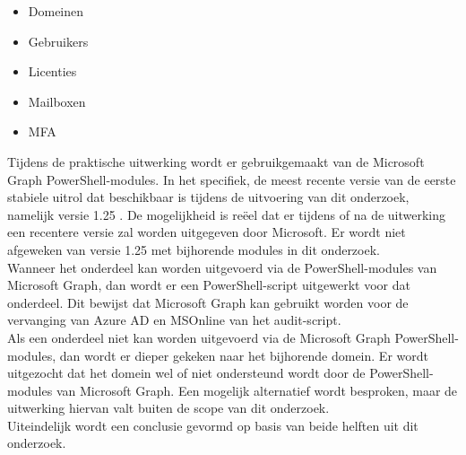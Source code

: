 \begin{itemize}
    \item Domeinen
    \item Gebruikers
    \item Licenties
    \item Mailboxen
    \item \ac{MFA}
\end{itemize}

Tijdens de praktische uitwerking wordt er gebruikgemaakt van de Microsoft Graph PowerShell-modules. In het specifiek, de meest recente versie van de eerste stabiele uitrol dat beschikbaar is tijdens de uitvoering van dit onderzoek, namelijk versie 1.25 \autocite{Microsoft2023k}. De mogelijkheid is reëel dat er tijdens of na de uitwerking een recentere versie zal worden uitgegeven door Microsoft. Er wordt niet afgeweken van versie 1.25 met bijhorende modules in dit onderzoek. \\  

Wanneer het onderdeel kan worden uitgevoerd via de PowerShell-modules van Microsoft Graph, dan wordt er een PowerShell-script uitgewerkt voor dat onderdeel. Dit bewijst dat Microsoft Graph kan gebruikt worden voor de vervanging van Azure \ac{AD} en MSOnline van het audit-script. \\

Als een onderdeel niet kan worden uitgevoerd via de Microsoft Graph PowerShell-modules, dan wordt er dieper gekeken naar het bijhorende domein. Er wordt uitgezocht dat het domein wel of niet ondersteund wordt door de PowerShell-modules van Microsoft Graph. Een mogelijk alternatief wordt besproken, maar de uitwerking hiervan valt buiten de scope van dit onderzoek. \\

Uiteindelijk wordt een conclusie gevormd op basis van beide helften uit dit onderzoek. 

